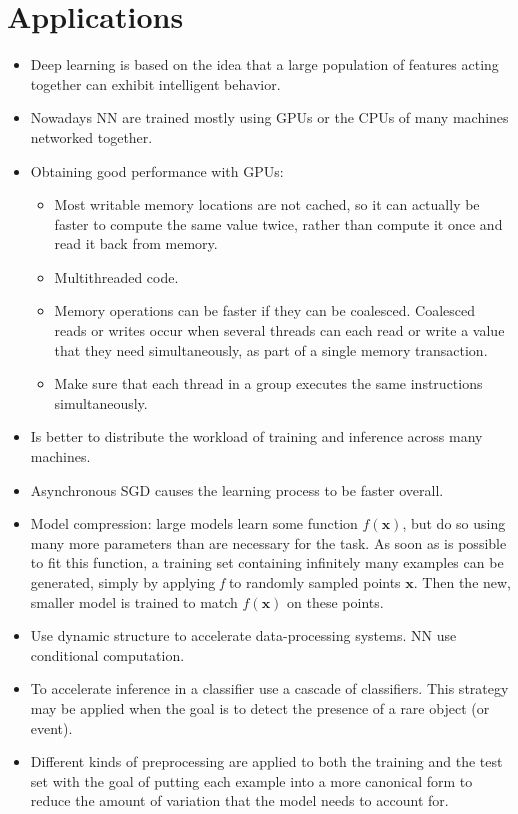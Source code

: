 \documentclass{article}
\begin{document}
\section{Applications}
\begin{itemize}
\item Deep learning is based on the idea that a large population of features acting together can exhibit intelligent behavior.
\item Nowadays NN are trained mostly using GPUs or the CPUs of many machines networked together.
\item Obtaining good performance with GPUs:
\begin{itemize}
\item Most writable memory locations are not cached, so it can actually be faster to compute the same value twice, rather than compute it once and read it back from memory.
\item Multithreaded code.
\item Memory operations can be faster if they can be coalesced. Coalesced reads or writes occur when several threads can each read or write a value that they need simultaneously, as part of a single memory transaction.
\item Make sure that each thread in a group executes the same instructions simultaneously.
\end{itemize}
\item Is better to distribute the workload of training and inference across many machines.
\item Asynchronous SGD causes the learning process to be faster overall.
\item Model compression: large models learn some function \(f(\boldsymbol{x})\), but do so using many more parameters than are necessary for the task. As soon as is possible to fit this function, a training set containing infinitely many examples can be generated, simply by applying \textit{f} to randomly sampled points \(\boldsymbol{x}\). Then the new, smaller model is trained to match \(f(\boldsymbol{x})\) on these points.
\item Use dynamic structure to accelerate data-processing systems. NN use conditional computation.
\item To accelerate inference in a classifier use a cascade of classifiers. This strategy may be applied when the goal is to detect the presence of a rare object (or event).
\item Different kinds of preprocessing are applied to both the training and the test set with the goal of putting each example into a more canonical form to reduce the amount of variation that the model needs to account for.

\end{itemize}
\end{document}
